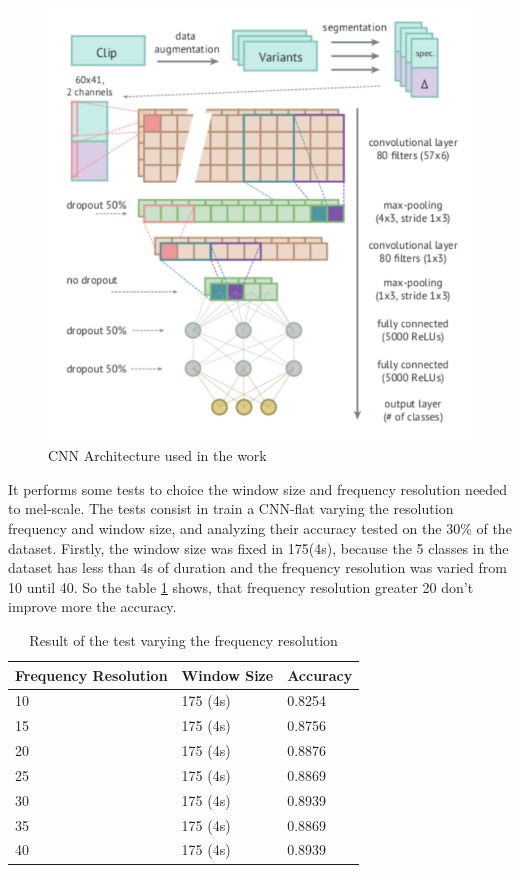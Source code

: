 \documentclass[12pt,oneside,a4paper]{article}
\begin{document}
\begin{figure}
	\centering
	\includegraphics[scale=1.0]{model.png}
	\caption{CNN Architecture used in the work \cite{piczak} }
	\label{fig:model}
\end{figure}


It performs some tests to choice the window size and frequency resolution needed to mel-scale. The tests consist in train a CNN-flat varying the resolution frequency and window size, and analyzing their accuracy tested on the 30\% of the dataset.
Firstly, the window size was fixed in 175(4s), because the 5 classes in the dataset has less than 4s of duration and the frequency resolution was varied from 10 until 40. So the table \ref{tab:frequency} shows, that frequency resolution greater 20 don't improve more the accuracy.

\begin{table}[H]
	\centering
	\begin{tabular}{@{}lll@{}}
		\toprule
		Frequency Resolution  &   Window Size    & Accuracy \\ \midrule
		10                    & 175 (4s)          & 0.8254  \\
		15                    & 175 (4s)          & 0.8756  \\
		20                    & 175 (4s)          & 0.8876  \\
		25                    & 175 (4s)          & 0.8869  \\
		30                    & 175 (4s)          & 0.8939  \\
		35                    & 175 (4s)          & 0.8869  \\
		40                    & 175 (4s)          & 0.8939  \\  \bottomrule
	\end{tabular}
	\label{tab:frequency}
	\caption{Result of the test varying the frequency resolution}
\end{table}
\end{document}

